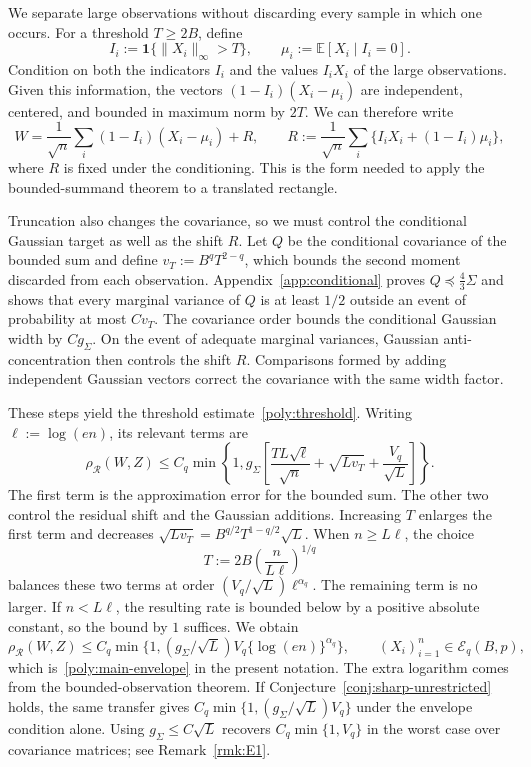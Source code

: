 \documentclass[11pt,letterpaper,twoside,leqno]{article}
\theoremstyle{bookplain}
\theoremstyle{bookremark}
\newcommand{\E}{\mathbb E}
\newcommand{\rh}{\rho_{\mathcal R}}
\newcommand{\ind}{\mathbf 1}
\begin{document}
We separate large observations without discarding every sample in
which one occurs. For a threshold $T\ge2B$, define
\[
 I_i:=\ind\{\|X_i\|_\infty>T\},\qquad
 \mu_i:=\E[X_i\mid I_i=0].
\]
Condition on both the indicators $I_i$ and the values $I_iX_i$ of
the large observations. Given this information, the vectors
$(1-I_i)(X_i-\mu_i)$ are independent, centered, and bounded in
maximum norm by $2T$. We can therefore write
\[
 W=\frac1{\sqrt n}\sum_i(1-I_i)(X_i-\mu_i)+R,
 \qquad
 R:=\frac1{\sqrt n}\sum_i\{I_iX_i+(1-I_i)\mu_i\},
\]
where $R$ is fixed under the conditioning. This is the form needed
to apply the bounded-summand theorem to a translated rectangle.

Truncation also changes the covariance, so we must control the
conditional Gaussian target as well as the shift $R$.
Let $Q$ be the conditional covariance of the bounded sum and define
$v_T:=B^qT^{2-q}$, which bounds the second moment discarded from
each observation. Appendix~\ref{app:conditional} proves
$Q\preceq\tfrac43\Sigma$ and shows that every marginal variance
of $Q$ is at least $1/2$ outside an event of probability at most
$Cv_T$. The covariance order bounds the conditional Gaussian width
by $Cg_\Sigma$. On the event of adequate marginal variances,
Gaussian anti-concentration then controls the shift $R$.
Comparisons formed by adding independent Gaussian vectors correct
the covariance with the same width factor.

These steps yield the threshold estimate~\eqref{poly:threshold}.
Writing $\ell:=\log(en)$, its relevant terms are
\[
 \rh(W,Z)\le C_q\min\left\{1,
 g_\Sigma\left[
 \frac{TL\sqrt\ell}{\sqrt n}
 +\sqrt{Lv_T}+\frac{V_q}{\sqrt L}\right]\right\}.
\]
The first term is the approximation error for the bounded sum.
The other two control the residual shift and the Gaussian additions.
Increasing $T$ enlarges the first term and decreases
$\sqrt{Lv_T}=B^{q/2}T^{1-q/2}\sqrt L$.
When $n\ge L\ell$, the choice
\[
 T:=2B\left(\frac n{L\ell}\right)^{1/q}
\]
balances these two terms at order
$(V_q/\sqrt L)\ell^{\alpha_q}$. The remaining term is no larger.
If $n<L\ell$, the resulting rate is bounded below by a positive
absolute constant, so the bound by $1$ suffices. We obtain
\begin{equation}
 \rh(W,Z)\le C_q\min\{1,(g_\Sigma/\sqrt L)
               V_q\{\log(en)\}^{\alpha_q}\},
 \qquad (X_i)_{i=1}^n\in\mathcal E_q(B,p),
 \label{poly:transfer-bound}
\end{equation}
which is~\eqref{poly:main-envelope} in the present notation.
The extra logarithm comes from the bounded-observation theorem.
If Conjecture~\ref{conj:sharp-unrestricted} holds, the same transfer
gives $C_q\min\{1,(g_\Sigma/\sqrt L)V_q\}$ under the envelope
condition alone. Using $g_\Sigma\le C\sqrt L$ recovers
$C_q\min\{1,V_q\}$ in the worst case over covariance matrices; see
Remark~\ref{rmk:E1}.
\end{document}
